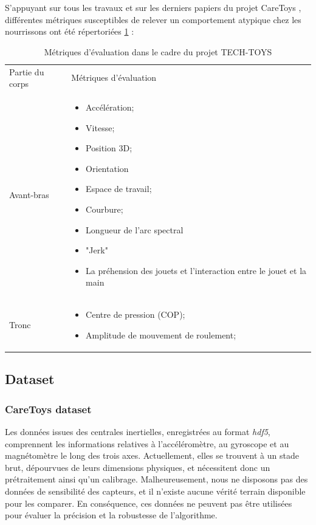 \documentclass[5pt]{article}
\begin{document}
S'appuyant sur tous les travaux et sur les derniers papiers du projet CareToys \cite{rihar_infant_2019,rihar_caretoy_2016,rihar_infant_2014}, différentes métriques susceptibles de relever un comportement atypique chez les nourrissons ont été répertoriées \ref{tab:metrics} :
\begin{table}[H]
    \centering
    \begin{tabularx}{\textwidth}{|p{}|X|}
    \rowcolor{lightgray}
     Partie du corps & Métriques d'évaluation\\
     Avant-bras &  \begin{itemize}
                        \item Accélération;
                        \item Vitesse;
                        \item Position 3D;
                        \item Orientation
                        \item Espace de travail;
                        \item Courbure;
                        \item Longueur de l'arc spectral
                        \item "Jerk"
                        \item La préhension des jouets et l'interaction entre le jouet et la main
                      \end{itemize}
                     \\
\hline
    Tronc & \begin{itemize}
                        \item Centre de pression (COP);
                        \item Amplitude de mouvement de roulement;
                      \end{itemize} \\
\hline
\end{tabularx}
    \caption{Métriques d'évaluation dans le cadre du projet TECH-TOYS}
    \label{tab:metrics}
\end{table}
\subsection{Dataset}
\subsubsection{CareToys dataset}
Les données issues des centrales inertielles, enregistrées au format \textit{hdf5}, comprennent les informations relatives à l'accéléromètre, au gyroscope et au magnétomètre le long des trois axes. Actuellement, elles se trouvent à un stade brut, dépourvues de leurs dimensions physiques, et nécessitent donc un prétraitement ainsi qu'un calibrage. Malheureusement, nous ne disposons pas des données de sensibilité des capteurs, et il n'existe aucune vérité terrain disponible pour les comparer. En conséquence, ces données ne peuvent pas être utilisées pour évaluer la précision et la robustesse de l'algorithme.
\end{document}
